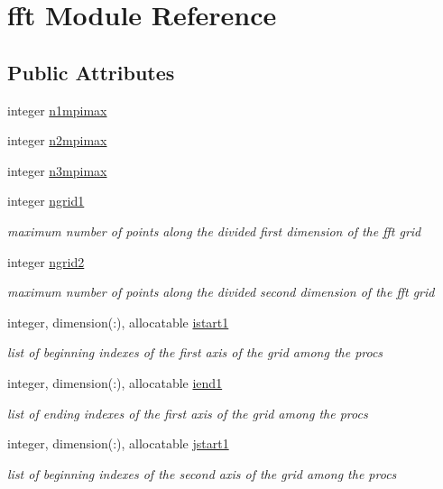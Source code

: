 \hypertarget{classfft}{\section{fft Module Reference}
\label{classfft}
}
\subsection*{Public Attributes}
\begin{DoxyCompactItemize}
\item 
integer \hyperlink{classfft_afe626585dd8cb0ac36fab5947a9d2521}{n1mpimax}
\item 
integer \hyperlink{classfft_a97762b74c5d11ea405cdb20a7d3a7106}{n2mpimax}
\item 
integer \hyperlink{classfft_aee4e8f13c1938be27c7a25e76c81e461}{n3mpimax}
\item 
integer \hyperlink{classfft_a94ef6ff65cf001df13131230f327e00c}{ngrid1}
\begin{DoxyCompactList}\small\item\em maximum number of points along the divided first dimension of the fft grid \end{DoxyCompactList}\item 
integer \hyperlink{classfft_a527c2e6b62c23d5b9499656757866ff6}{ngrid2}
\begin{DoxyCompactList}\small\item\em maximum number of points along the divided second dimension of the fft grid \end{DoxyCompactList}\item 
integer, dimension(\-:), allocatable \hyperlink{classfft_a0f2de67487b3b9ef7ab687ea7aa6f789}{istart1}
\begin{DoxyCompactList}\small\item\em list of beginning indexes of the first axis of the grid among the procs \end{DoxyCompactList}\item 
integer, dimension(\-:), allocatable \hyperlink{classfft_af7c211bc5279a97bd104e261d7c42909}{iend1}
\begin{DoxyCompactList}\small\item\em list of ending indexes of the first axis of the grid among the procs \end{DoxyCompactList}\item 
integer, dimension(\-:), allocatable \hyperlink{classfft_ab253fc8733e246ba7dcb5f806ef1c439}{jstart1}
\begin{DoxyCompactList}\small\item\em list of beginning indexes of the second axis of the grid among the procs \end{DoxyCompactList}\item 

\end{DoxyCompactItemize}
